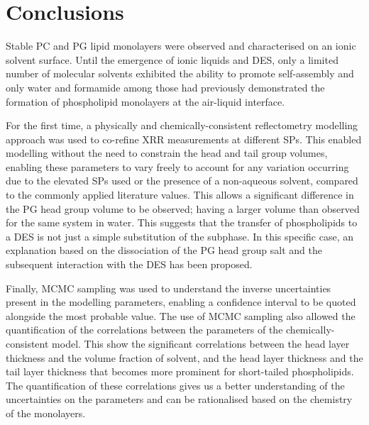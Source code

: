 \section{Conclusions}
Stable PC and PG lipid monolayers were observed and characterised on an ionic solvent surface.
Until the emergence of ionic liquids and DES, only a limited number of molecular solvents exhibited the ability to promote self-assembly and only water and formamide among those had previously demonstrated the formation of phospholipid monolayers at the air-liquid interface.

For the first time, a physically and chemically-consistent reflectometry modelling approach was used to co-refine XRR measurements at different SPs.
This enabled modelling without the need to constrain the head and tail group volumes, enabling these parameters to vary freely to account for any variation occurring due to the elevated SPs used or the presence of a non-aqueous solvent, compared to the commonly applied literature values.
This allows a significant difference in the PG head group volume to be observed; having a larger volume than observed for the same system in water.
This suggests that the transfer of phospholipids to a DES is not just a simple substitution of the subphase.
In this specific case, an explanation based on the dissociation of the PG head group salt and the subsequent interaction with the DES has been proposed.

Finally, MCMC sampling was used to understand the inverse uncertainties present in the modelling parameters, enabling a confidence interval to be quoted alongside the most probable value.
The use of MCMC sampling also allowed the quantification of the correlations between the parameters of the chemically-consistent model.
This show the significant correlations between the head layer thickness and the volume fraction of solvent, and the head layer thickness and the tail layer thickness that becomes more prominent for short-tailed phospholipids.
The quantification of these correlations gives us a better understanding of the uncertainties on the parameters and can be rationalised based on the chemistry of the monolayers.
